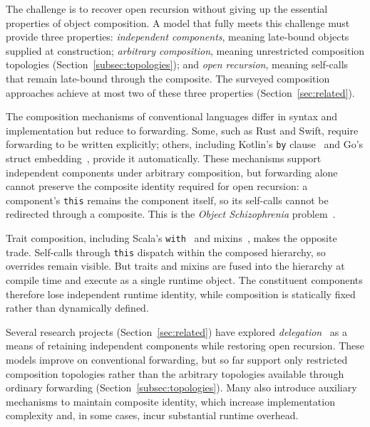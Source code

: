 \documentclass[acmsmall,nonacm]{acmart}
\theoremstyle{acmplain}
\newcommand{\code}[1]{\texttt{#1}}
\begin{document}
The challenge is to recover open recursion without giving up the essential properties of object composition. A model
that fully meets this challenge must provide three properties: \emph{independent components}, meaning late-bound objects
supplied at construction; \emph{arbitrary composition}, meaning unrestricted composition topologies (Section~\ref{subsec:topologies}); and
\emph{open recursion}, meaning self-calls that remain late-bound through the composite. The surveyed composition
approaches achieve at most two of these three properties (Section~\ref{sec:related}).

The composition mechanisms of conventional languages differ in syntax and implementation but reduce to forwarding.
Some, such as Rust and Swift, require forwarding to be written explicitly; others, including Kotlin's \code{by}
clause~\cite{kotlin} and Go's struct embedding~\cite{go}, provide it automatically. These mechanisms support independent
components under arbitrary composition, but forwarding alone cannot preserve the composite identity required for open
recursion: a component's \code{this} remains the component itself, so its self-calls cannot be redirected through a
composite. This is the \emph{Object Schizophrenia} problem~\cite{sekharaiah2002,kniesel2000}.

Trait composition, including Scala's \code{with}~\cite{odersky2005} and mixins~\cite{bracha1990}, makes the opposite
trade. Self-calls through \code{this} dispatch within the composed hierarchy, so overrides remain visible. But traits
and mixins are fused into the hierarchy at compile time and execute as a single runtime object. The constituent
components therefore lose independent runtime identity, while composition is statically fixed rather than dynamically
defined.

Several research projects (Section~\ref{sec:related}) have explored \emph{delegation}~\cite{lieberman1986,kniesel1999}
as a means of retaining independent components while restoring open recursion. These models improve on conventional
forwarding, but so far support only restricted composition topologies rather than the arbitrary topologies available
through ordinary forwarding (Section~\ref{subsec:topologies}). Many also introduce auxiliary mechanisms to maintain
composite identity, which increase implementation complexity and, in some cases, incur substantial runtime overhead.
\end{document}
